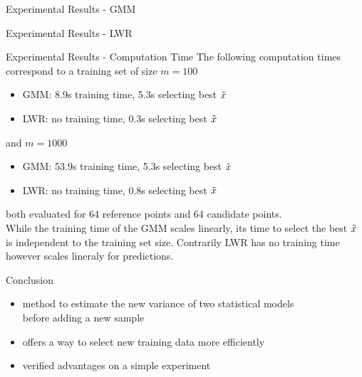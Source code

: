 \begin{frame}{Experimental Results - GMM}
\end{frame}

\begin{frame}{Experimental Results - LWR}
\end{frame}

\begin{frame}{Experimental Results - Computation Time}
The following computation times correspond to a training set of size $m=100$
\begin{itemize}
\item GMM: 8.9s training time, 5.3s selecting best $\tilde{x}$
\item LWR: no training time, 0.3s selecting best $\tilde{x}$
\end{itemize}
and $m=1000$
\begin{itemize}
\item GMM: 53.9s training time, 5.3s selecting best $\tilde{x}$
\item LWR: no training time, 0.8s selecting best $\tilde{x}$
\end{itemize}
both evaluated for 64 reference points and 64 candidate points.\\
\vspace{\baselineskip}
While the training time of the GMM scales linearly, its time to select
the best $\tilde{x}$ is independent to the training set size. Contrarily LWR has no
training time however scales lineraly for predictions.
\end{frame}

\begin{frame}{Conclusion}
\begin{itemize}
\item method to estimate the new variance of two statistical models\\
 before adding a new sample
\item offers a way to select new training data more efficiently
\item verified advantages on a simple experiment
\end{itemize}
\end{frame}